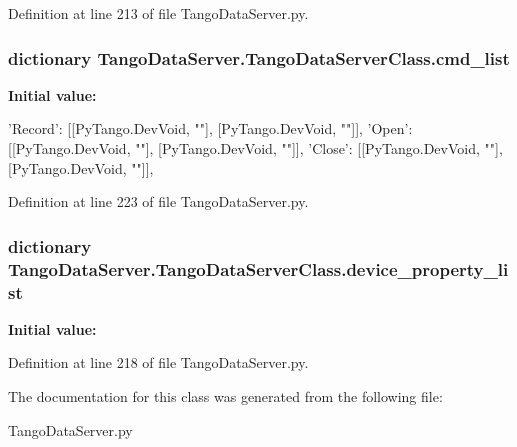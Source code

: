 Definition at line 213 of file TangoDataServer.py.\hypertarget{classTangoDataServer_1_1TangoDataServerClass_a80f2a3d0025b00a3b74a66a70f336cee}{
\subsubsection[{cmd\_\-list}]{\setlength{\rightskip}{0pt plus 5cm}dictionary TangoDataServer.TangoDataServerClass.cmd\_\-list}}
\label{classTangoDataServer_1_1TangoDataServerClass_a80f2a3d0025b00a3b74a66a70f336cee}
{\bfseries Initial value:}
\begin{DoxyCode}
{
                'Record':
                        [[PyTango.DevVoid, ""],
                        [PyTango.DevVoid, ""]],
                'Open':
                        [[PyTango.DevVoid, ""],
                        [PyTango.DevVoid, ""]],
                'Close':
                        [[PyTango.DevVoid, ""],
                        [PyTango.DevVoid, ""]],
                }
\end{DoxyCode}


Definition at line 223 of file TangoDataServer.py.\hypertarget{classTangoDataServer_1_1TangoDataServerClass_af22f75983ee5e09c01238043271118ba}{
\subsubsection[{device\_\-property\_\-list}]{\setlength{\rightskip}{0pt plus 5cm}dictionary TangoDataServer.TangoDataServerClass.device\_\-property\_\-list}}
\label{classTangoDataServer_1_1TangoDataServerClass_af22f75983ee5e09c01238043271118ba}
{\bfseries Initial value:}
\begin{DoxyCode}
{
                }
\end{DoxyCode}


Definition at line 218 of file TangoDataServer.py.

The documentation for this class was generated from the following file:\begin{DoxyCompactItemize}
\item 
TangoDataServer.py\end{DoxyCompactItemize}

